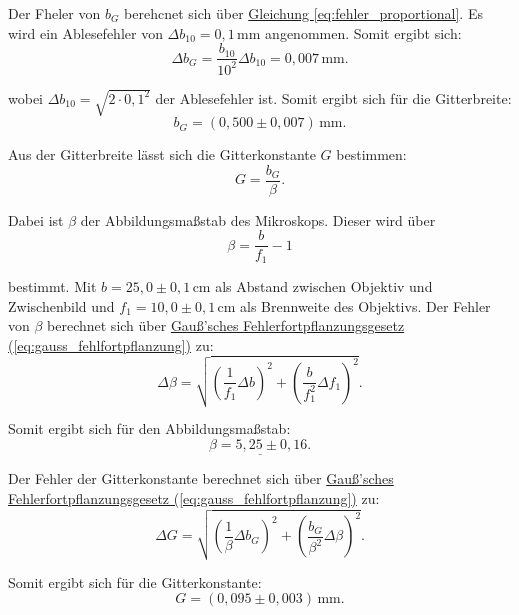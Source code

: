 Der Fheler von $b_G$ berehcnet sich über \hyperref[eq:fehler_proportional]{Gleichung \ref*{eq:fehler_proportional}}. Es wird ein Ablesefehler von $\Delta b_{10} = 0{,}1\,\mathrm{mm}$ angenommen. Somit ergibt sich:
\begin{equation}
    \Delta b_G = \frac{b_{10}}{10^2} \Delta b_{10} = 0{,}007\,\mathrm{mm}.
\end{equation}

wobei $\Delta b_{10} = \sqrt{2 \cdot 0,1^2}$ der Ablesefehler ist. Somit ergibt sich für die Gitterbreite:
\begin{equation}
    \boxed{
        b_G = (0{,}500 \pm 0{,}007)\,\mathrm{mm}.
    }
\end{equation}

Aus der Gitterbreite lässt sich die Gitterkonstante $G$ bestimmen:
\begin{equation}
    G = \frac{b_G}{\beta}.
\end{equation}

Dabei ist $\beta$ der Abbildungsmaßstab des Mikroskops. Dieser wird über
\begin{equation}
    \beta = \frac{b}{f_1} - 1
\end{equation}

bestimmt. Mit $b = 25{,}0 \pm 0{,}1\,\mathrm{cm}$ als Abstand zwischen Objektiv und Zwischenbild und $f_1 = 10{,}0 \pm 0{,}1\,\mathrm{cm}$ als Brennweite des Objektivs. Der Fehler von $\beta$ berechnet sich über \hyperref[eq:gauss_fehlfortpflanzung]{Gauß'sches Fehlerfortpflanzungsgesetz (\ref*{eq:gauss_fehlfortpflanzung})} zu:
\begin{equation}
    \Delta \beta = \sqrt{\left(\frac{1}{f_1} \Delta b\right)^2 + \left(\frac{b}{f_1^2} \Delta f_1\right)^2}.
\end{equation}

Somit ergibt sich für den Abbildungsmaßstab:
\begin{equation}
    \underline{
        \beta = 5{,}25 \pm 0{,}16.
    }
\end{equation}

Der Fehler der Gitterkonstante berechnet sich über \hyperref[eq:gauss_fehlfortpflanzung]{Gauß'sches Fehlerfortpflanzungsgesetz (\ref*{eq:gauss_fehlfortpflanzung})} zu:
\begin{equation}
    \Delta G = \sqrt{\left(\frac{1}{\beta} \Delta b_G\right)^2 + \left(\frac{b_G}{\beta^2} \Delta \beta\right)^2}.
\end{equation}  

Somit ergibt sich für die Gitterkonstante:
\begin{equation}
    \boxed{
        G = (0{,}095 \pm 0{,}003)\,\mathrm{mm}.
    }
\end{equation}

